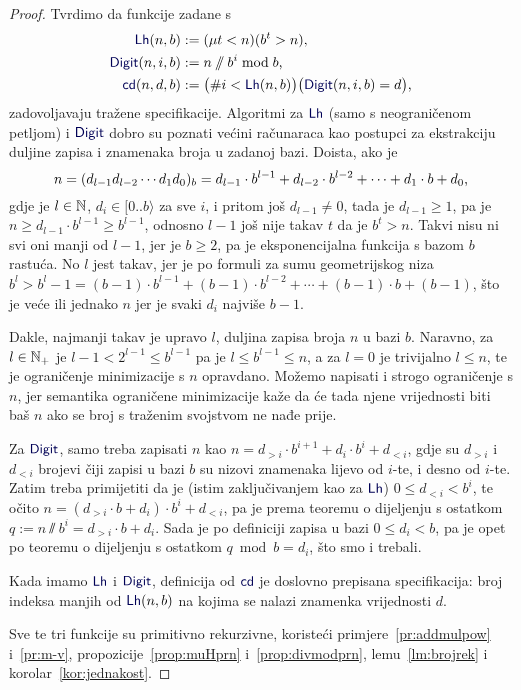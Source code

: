 \begin{proof}
Tvrdimo da funkcije zadane s
\begin{align}
    \f{Lh}(n,b)&:=(\mu t< n)(b^t>n)\text,\\
    \f{Digit}(n,i,b)&:=n\sslash b^i\bmod b\text,\\
    \f{cd}(n,d,b)&:=\bigl(\#i<\f{Lh}(n,b)\bigr)\bigl(\f{Digit}(n,i,b)=d\bigr)\text,
\end{align}
zadovoljavaju tražene specifikacije. Algoritmi za $\f{Lh}$ (samo s neograničenom petljom) i $\f{Digit}$ dobro su poznati većini računaraca kao postupci za ekstrakciju duljine zapisa i znamenaka broja u zadanoj bazi. Doista, ako je 
\begin{equation}
n=(d_{l-1}d_{l-2}\dotsm d_1d_0)_b=d_{l-1}\cdot b^{l-1}+d_{l-2}\cdot b^{l-2}+\dotsb+d_1\cdot b+d_0\text,
\end{equation}
gdje je $l\in{\mathbb N}$, $d_i\in[0..b\rangle$ za sve $i$, i pritom još $d_{l-1}\not=0$, tada je $d_{l-1}\ge1$, pa je $n\ge d_{l-1}\cdot b^{l-1}\ge b^{l-1}$, odnosno $l-1$ još nije takav $t$ da je $b^t>n$. Takvi nisu ni svi oni manji od $l-1$, jer je $b\ge 2$, pa je eksponencijalna funkcija s bazom $b$ rastuća. No $l$ jest takav, jer je po formuli za sumu geometrijskog niza $b^l>b^l-1=(b-1)\cdot b^{l-1}+(b-1)\cdot b^{l-2}+\dotsb+(b-1)\cdot b+(b-1)$, što je veće ili jednako $n$ jer je svaki $d_i$ najviše $b-1$.

Dakle, najmanji takav je upravo $l$, duljina zapisa broja $n$ u bazi $b$. Naravno, za $l\in{\mathbb N}_+$ je $l-1<2^{l-1}\le b^{l-1}$ pa je $l\le b^{l-1}\le n$, a za $l=0$ je trivijalno $l\le n$, te je ograničenje minimizacije s $n$ opravdano. Možemo napisati i strogo ograničenje s $n$, jer semantika ograničene minimizacije kaže da će tada njene vrijednosti biti baš $n$ ako se broj s traženim svojstvom ne nađe prije.

Za $\f{Digit}$, samo treba zapisati $n$ kao $n=d_{>i}\cdot b^{i+1}+d_i\cdot b^i+d_{<i}$, gdje su $d_{>i}$ i $d_{<i}$ brojevi čiji zapisi u bazi $b$ su nizovi znamenaka lijevo od $i$-te, i desno od $i$-te. Zatim treba primijetiti da je (istim zaključivanjem kao za $\f{Lh}$) $0\le d_{<i}<b^i$, te očito $n=(d_{>i}\cdot b+d_i)\cdot b^i+d_{<i}$, pa je prema teoremu o dijeljenju s ostatkom $q:=n\sslash b^i=d_{>i}\cdot b+d_i$. Sada je po definiciji zapisa u bazi $0\le d_i<b$, pa je opet po teoremu o dijeljenju s ostatkom $q\bmod b=d_i$, što smo i trebali.

Kada imamo $\f{Lh}$ i $\f{Digit}$, definicija od $\f{cd}$ je doslovno prepisana specifikacija: broj indeksa manjih od $\f{Lh}(n,b)$ na kojima se nalazi znamenka vrijednosti $d$.

Sve te tri funkcije su primitivno rekurzivne, koristeći primjere~\ref{pr:addmulpow} i~\ref{pr:m-v}, propozicije~\ref{prop:muHprn} i~\ref{prop:divmodprn}, lemu~\ref{lm:brojrek} i korolar~\ref{kor:jednakost}.
\end{proof}

